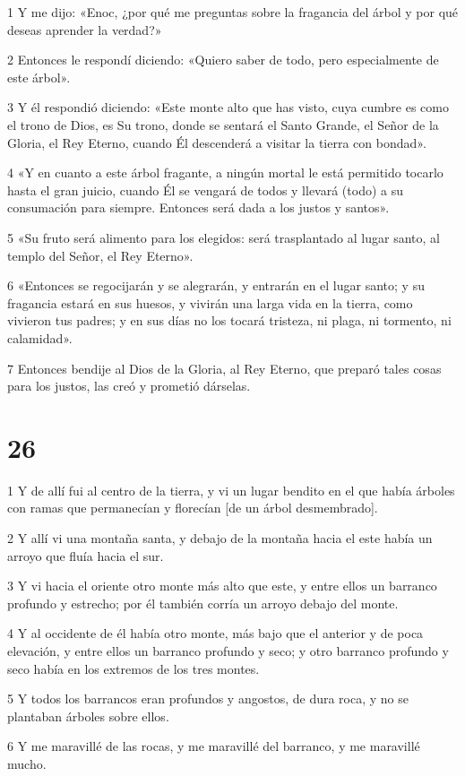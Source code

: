 \par 1 Y me dijo: «Enoc, ¿por qué me preguntas sobre la fragancia del árbol y por qué deseas aprender la verdad?»
\par 2 Entonces le respondí diciendo: «Quiero saber de todo, pero especialmente de este árbol».
\par 3 Y él respondió diciendo: «Este monte alto que has visto, cuya cumbre es como el trono de Dios, es Su trono, donde se sentará el Santo Grande, el Señor de la Gloria, el Rey Eterno, cuando Él descenderá a visitar la tierra con bondad».
\par 4 «Y en cuanto a este árbol fragante, a ningún mortal le está permitido tocarlo hasta el gran juicio, cuando Él se vengará de todos y llevará (todo) a su consumación para siempre. Entonces será dada a los justos y santos».
\par 5 «Su fruto será alimento para los elegidos: será trasplantado al lugar santo, al templo del Señor, el Rey Eterno».
\par 6 «Entonces se regocijarán y se alegrarán, y entrarán en el lugar santo; y su fragancia estará en sus huesos, y vivirán una larga vida en la tierra, como vivieron tus padres; y en sus días no los tocará tristeza, ni plaga, ni tormento, ni calamidad».
\par 7 Entonces bendije al Dios de la Gloria, al Rey Eterno, que preparó tales cosas para los justos, las creó y prometió dárselas.

\chapter{26}

\par 1 Y de allí fui al centro de la tierra, y vi un lugar bendito en el que había árboles con ramas que permanecían y florecían [de un árbol desmembrado].
\par 2 Y allí vi una montaña santa, y debajo de la montaña hacia el este había un arroyo que fluía hacia el sur.
\par 3 Y vi hacia el oriente otro monte más alto que este, y entre ellos un barranco profundo y estrecho; por él también corría un arroyo debajo del monte.
\par 4 Y al occidente de él había otro monte, más bajo que el anterior y de poca elevación, y entre ellos un barranco profundo y seco; y otro barranco profundo y seco había en los extremos de los tres montes.
\par 5 Y todos los barrancos eran profundos y angostos, de dura roca, y no se plantaban árboles sobre ellos.
\par 6 Y me maravillé de las rocas, y me maravillé del barranco, y me maravillé mucho.

